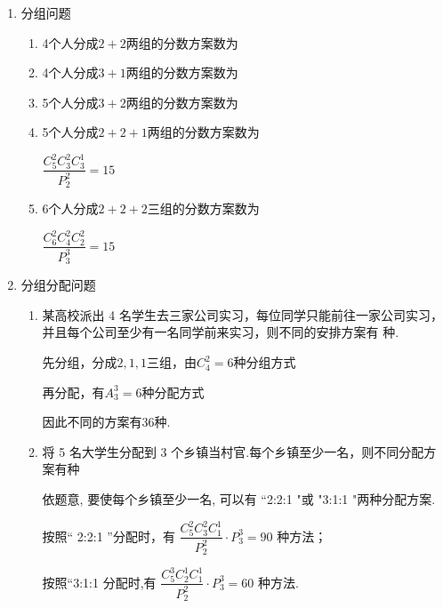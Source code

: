 \begin{enumerate}
\begin{enumerate}
\begin{jieda}
            以上三类情况不合要求应减掉， $\therefore$ 不同的取法共有 ${{C}}_{10}^{4} - 4{{C}}_{6}^{4} - 6 - 3 = {141}$ 种.
        \end{jieda}
        \end{enumerate}
    \item 分组问题
    \begin{enumerate}
        \item 4个人分成$2+2$两组的分数方案数为
        \item 4个人分成$3+1$两组的分数方案数为
        \item 5个人分成$3+2$两组的分数方案数为
        \item 5个人分成$2+2+1$两组的分数方案数为
        \begin{jieda}
            $\dfrac{{{C}}_{5}^{2}{{C}}_{3}^{2}{{C}}_{3}^{1}}{P_{2}^{2}} = {15}$
        \end{jieda}
        \item 6个人分成$2+2+2$三组的分数方案数为
        \begin{jieda}
            $\dfrac{{{C}}_{6}^{2}{{C}}_{4}^{2}{{C}}_{2}^{2}}{P_{3}^{3}} = {15}$
        \end{jieda}
    \end{enumerate}
    \item 分组分配问题
    \begin{enumerate}
        \item 某高校派出 4 名学生去三家公司实习，每位同学只能前往一家公司实习，并且每个公司至少有一名同学前来实习，则不同的安排方案有 种.
        \begin{jieda}
        先分组，分成$2,1,1$三组，由$C_4^2 = 6$种分组方式

            再分配，有$A_3^3 = 6$种分配方式
            
            因此不同的方案有$36$种.
        \end{jieda}
        
        \item 将 5 名大学生分配到 3 个乡镇当村官.每个乡镇至少一名，则不同分配方案有种
        \begin{jieda}
            依题意, 要使每个乡镇至少一名, 可以有 “2:2:1 "或 "3:1:1 "两种分配方案.

            按照“ 2:2:1 ”分配时，有 $\dfrac{{{C}}_{5}^{2}{{C}}_{3}^{2}{{C}}_{1}^{1}}{P_{2}^{2}} \cdot  P_{3}^{3} = {90}$ 种方法；
            
            按照“3:1:1 分配时,有 $\dfrac{{{C}}_{5 }^{3}{{C}}_{2}^{1}{{C}}_{1}^{1}}{P_{2}^{2}} \cdot  P_{3}^{3} = {60}$ 种方法.
            

\end{jieda}
\end{enumerate}
\end{enumerate}
